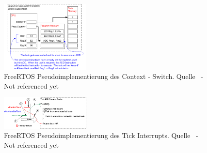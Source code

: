 \begin{figure}[ht!]
	\centering
		\includegraphics[width=0.4\textwidth]{Pictures/FreeRTOSOrg/ExeContext.png}
	\caption{FreeRTOS Pseudoimplementierung des Context - Switch. Quelle~\protect{} - Not referenced yet}
	\label{fig:FreeRTOSFsm}
	
\end{figure}

\begin{figure}[ht!]
	\centering
		\includegraphics[width=0.4\textwidth]{Pictures/FreeRTOSOrg/TickISR.png}
	\caption{FreeRTOS Pseudoimplementierung des Tick Interrupts. Quelle~\protect{} - Not referenced yet}
	\label{fig:FreeRTOSFsm}
\end{figure}